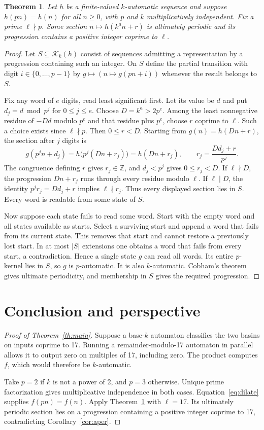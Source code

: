 \documentclass[11pt,a4paper]{article}
\newtheorem{theorem}{Theorem}
\newcommand{\K}{\mathcal K}
\begin{document}
\begin{theorem}\label{th:kernel}
Let $h$ be a finite-valued $k$-automatic sequence and suppose $h(pn)=h(n)$ for all $n\ge0$, with $p$ and $k$ multiplicatively independent. Fix a prime $\ell\nmid p$. Some section $n\mapsto h(k^a n+r)$ is ultimately periodic and its progression contains a positive integer coprime to $\ell$.
\end{theorem}
\begin{proof}
Let $S\subseteq\K_k(h)$ consist of sequences admitting a representation by a progression containing such an integer. On $S$ define the partial transition with digit $i\in\{0,\ldots,p-1\}$ by $g\mapsto(n\mapsto g(pn+i))$ whenever the result belongs to $S$.

Fix any word of $e$ digits, read least significant first. Let its value be $d$ and put $d_j=d\bmod p^j$ for $0\le j\le e$. Choose $D=k^a>2p^e$. Among the least nonnegative residue of $-Dd$ modulo $p^e$ and that residue plus $p^e$, choose $r$ coprime to $\ell$. Such a choice exists since $\ell\nmid p$. Then $0\le r<D$. Starting from $g(n)=h(Dn+r)$, the section after $j$ digits is
\[
 g(p^j n+d_j)=h\bigl(p^j(Dn+r_j)\bigr)=h(Dn+r_j),
 \qquad r_j=\frac{Dd_j+r}{p^j}.
\]
The congruence defining $r$ gives $r_j\in\mathbb Z$, and $d_j<p^j$ gives $0\le r_j<D$. If $\ell\nmid D$, the progression $Dn+r_j$ runs through every residue modulo $\ell$. If $\ell\mid D$, the identity $p^jr_j=Dd_j+r$ implies $\ell\nmid r_j$. Thus every displayed section lies in $S$. Every word is readable from some state of $S$.

Now suppose each state fails to read some word. Start with the empty word and all states available as starts. Select a surviving start and append a word that fails from its current state. This removes that start and cannot restore a previously lost start. In at most $|S|$ extensions one obtains a word that fails from every start, a contradiction. Hence a single state $g$ can read all words. Its entire $p$-kernel lies in $S$, so $g$ is $p$-automatic. It is also $k$-automatic. Cobham's theorem gives ultimate periodicity, and membership in $S$ gives the required progression.
\end{proof}

\newpage
\section{Conclusion and perspective}
\begin{proof}[Proof of Theorem~\ref{th:main}]
Suppose a base-$k$ automaton classifies the two basins on inputs coprime to 17. Running a remainder-modulo-17 automaton in parallel allows it to output zero on multiples of 17, including zero. The product computes $f$, which would therefore be $k$-automatic.

Take $p=2$ if $k$ is not a power of 2, and $p=3$ otherwise. Unique prime factorization gives multiplicative independence in both cases. Equation~\eqref{eq:dilate} supplies $f(pn)=f(n)$. Apply Theorem~\ref{th:kernel} with $\ell=17$. Its ultimately periodic section lies on a progression containing a positive integer coprime to 17, contradicting Corollary~\ref{cor:aper}.
\end{proof}
\end{document}
